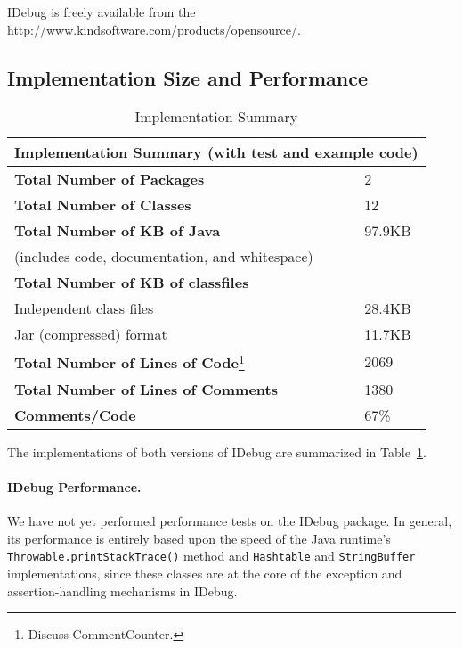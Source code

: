 \documentclass{article}
\begin{document}
IDebug is freely available from the 
{http://www.kindsoftware.com/products/opensource/}.

\subsection{Implementation Size and Performance}

\begin{table}[htbp]
  \begin{center}
    \begin{tabular}{|l|l|}
      \hline
      \multicolumn{2}{|c|}{Implementation Summary (with test and
        example code)}
      \\ \hline\hline
      \textbf{Total Number of Packages} & 2 \\ \hline
      \textbf{Total Number of Classes} & 12 \\ \hline
      \textbf{Total Number of KB of Java} & 97.9KB \\
      (includes code, documentation, and whitespace) & \\ \hline
      \textbf{Total Number of KB of classfiles} & \\
      Independent class files & 28.4KB \\
      Jar (compressed) format & 11.7KB \\ \hline
      \textbf{Total Number of Lines of Code}\footnote{Discuss 
        CommentCounter.} & 2069 \\ \hline
      \textbf{Total Number of Lines of Comments} & 1380 \\ \hline
      \textbf{Comments/Code} & 67\% \\ \hline
    \end{tabular}
    \caption{Implementation Summary}
    \label{tab:impl_summary}
  \end{center}
\end{table}

The implementations of both versions of IDebug are summarized in
Table~\ref{tab:impl_summary}.

\paragraph{IDebug Performance.} 
We have not yet performed performance tests on the IDebug package.  In
general, its performance is entirely based upon the speed of the Java
runtime's \texttt{Throwable.printStackTrace()} method and
\texttt{Hashtable} and \texttt{StringBuffer} implementations, since
these classes are at the core of the exception and assertion-handling
mechanisms in IDebug.
\end{document}
